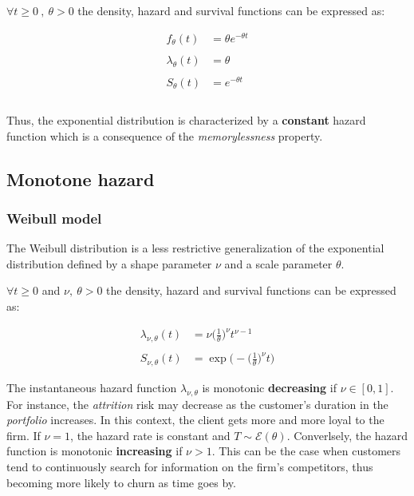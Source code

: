 \documentclass[
]{book}
\begin{document}
\(\forall t \geq 0\ ,\ \theta > 0\) the density, hazard and survival functions can be expressed as:

\begin{equation}
  \begin{aligned}
    f_{\theta}(t) & = \theta e^{-\theta t} \\\\
    \lambda_{\theta}(t) & = \theta \\\\
    S_{\theta}(t) & = e^{-\theta t} \\\\
  \end{aligned}
  \label{eq:exponential}
\end{equation}

Thus, the exponential distribution is characterized by a \textbf{constant} hazard function which is a consequence of the \emph{memorylessness} property.

\hypertarget{monotone-hazard}{%
\subsection{Monotone hazard}\label{monotone-hazard}}

\hypertarget{weibull-model}{%
\subsubsection*{Weibull model}\label{weibull-model}}

The Weibull distribution is a less restrictive generalization of the exponential distribution defined by a shape parameter \(\nu\) and a scale parameter \(\theta\).

\(\forall t \geq 0\) and \(\nu,\ \theta > 0\) the density, hazard and survival functions can be expressed as:

\begin{equation}
  \begin{aligned}
      \lambda_{\nu,\theta}(t) & = \nu \bigg(\frac{1}{\theta}\bigg)^{\nu} t^{\nu - 1} \\\\
      S_{\nu, \theta}(t) & = \exp \Bigg( -\bigg(\frac{1}{\theta}\bigg)^{\nu} t\Bigg) 
  \end{aligned}
  \label{eq:weibull}
\end{equation}

The instantaneous hazard function \(\lambda_{\nu,\theta}\) is monotonic \textbf{decreasing} if \(\nu \in [0, 1]\). For instance, the \emph{attrition} risk may decrease as the customer's duration in the \emph{portfolio} increases. In this context, the client gets more and more loyal to the firm. If \(\nu=1\), the hazard rate is constant and \(T \sim \mathcal{E}(\theta)\). Converlsely, the hazard function is monotonic \textbf{increasing} if \(\nu > 1\). This can be the case when customers tend to continuously search for information on the firm's competitors, thus becoming more likely to churn as time goes by.
\end{document}
